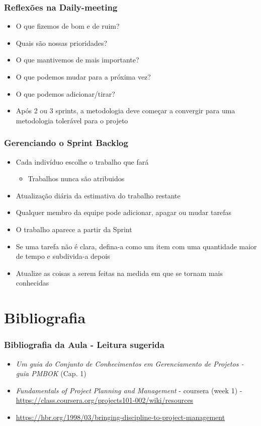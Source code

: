 \begin{frame}
 \frametitle{Reflexões na Daily-meeting}
 \begin{itemize}
  \item O que fizemos de bom e de ruim?
  \item Quais são nossas prioridades?
  \item O que mantivemos de mais importante?
  \item O que podemos mudar para a próxima vez?
  \item O que podemos adicionar/tirar?

  \item Após 2 ou 3 sprints, a metodologia deve começar a convergir para uma metodologia tolerável para o projeto
 \end{itemize}
\end{frame}

\begin{frame}
 \frametitle{Gerenciando o Sprint Backlog}
 \begin{itemize}
  \item Cada indivíduo escolhe o trabalho que fará
  \begin{itemize}
   \item Trabalhos nunca são atribuidos
  \end{itemize}
  \item Atualização diária da estimativa do trabalho restante
  \item Qualquer membro da equipe pode adicionar, apagar ou mudar tarefas
  \item O trabalho aparece a partir da Sprint
  \item Se uma tarefa não é clara, defina-a como um item com uma quantidade maior de tempo e subdivida-a depois
  \item Atualize as coisas a serem feitas na medida em que se tornam mais conhecidas
 \end{itemize}

\end{frame}

\section{Bibliografia}
\begin{frame}
 \frametitle{Bibliografia da Aula - Leitura sugerida}
 \begin{itemize}
  \item \textit{Um guia do Conjunto de Conhecimentos em Gerenciamento de Projetos - guia PMBOK} (Cap. 1)
  \item \textit{Fundamentals of Project Planning and Management} - coursera (week 1) - \url{https://class.coursera.org/projects101-002/wiki/resources}
  \item \url{https://hbr.org/1998/03/bringing-discipline-to-project-management}
  \end{itemize}

\end{frame}
